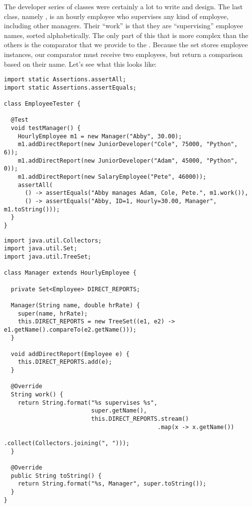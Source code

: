 The developer series of classes were certainly a lot to write and design. The last class, namely , is an hourly employee who supervises any kind of employee, including other managers. Their ``work'' is that they are ``supervising'' employee names, sorted alphabetically. The only part of this that is more complex than the others is the comparator that we provide to the . Because the set stores employee instances, our comparator must receive two employees, but return a comparison based on their name. Let's see what this looks like:

\begin{lstlisting}[language=MyJava]
import static Assertions.assertAll;
import static Assertions.assertEquals;

class EmployeeTester {

  @Test
  void testManager() {
    HourlyEmployee m1 = new Manager("Abby", 30.00);
    m1.addDirectReport(new JuniorDeveloper("Cole", 75000, "Python", 6));
    m1.addDirectReport(new JuniorDeveloper("Adam", 45000, "Python", 0));
    m1.addDirectReport(new SalaryEmployee("Pete", 46000));
    assertAll(
      () -> assertEquals("Abby manages Adam, Cole, Pete.", m1.work()),
      () -> assertEquals("Abby, ID=1, Hourly=30.00, Manager", m1.toString()));
  }
}
\end{lstlisting}

\begin{lstlisting}[language=MyJava]
import java.util.Collectors;
import java.util.Set;
import java.util.TreeSet;

class Manager extends HourlyEmployee {

  private Set<Employee> DIRECT_REPORTS;

  Manager(String name, double hrRate) {
    super(name, hrRate);
    this.DIRECT_REPORTS = new TreeSet((e1, e2) -> e1.getName().compareTo(e2.getName()));
  }

  void addDirectReport(Employee e) {
    this.DIRECT_REPORTS.add(e);
  }

  @Override
  String work() {
    return String.format("%s supervises %s", 
                         super.getName(),
                         this.DIRECT_REPORTS.stream()
                                            .map(x -> x.getName())
                                            .collect(Collectors.joining(", ")));
  }

  @Override
  public String toString() {
    return String.format("%s, Manager", super.toString());
  }
}
\end{lstlisting}

